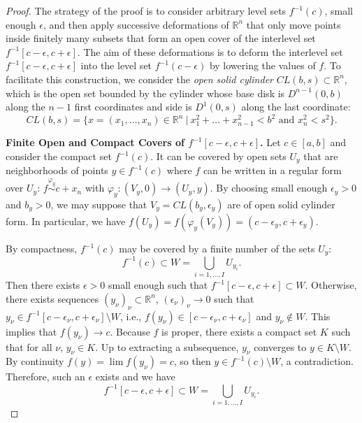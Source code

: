 \documentclass[11pt]{article}
\newcommand{\R}{\mathbb{R}}
\newcommand{\eps}{\epsilon}
\theoremstyle{plain}
\theoremstyle{definition}
\theoremstyle{remark}
\begin{document}
	\begin{proof}
		The strategy of the proof is to consider arbitrary level sets $f^{-1}(c)$, small enough $\eps$, and then apply successive deformations of $\R^n$ that only move points inside finitely many subsets that form an open cover of the interlevel set $f^{-1}[c-\eps, c+ \eps]$. The aim of these deformations is to deform the interlevel set $f^{-1}[c-\eps, c+ \eps]$ into the level set $f^{-1}(c-\eps)$ by lowering the values of $f$. To facilitate this construction, we consider the \emph{open solid cylinder} $CL(b,s) \subset \R^n$, which is the open set bounded by the cylinder whose base disk is $D^{n-1}(0, b)$ along the $n-1$ first coordinates and side is $D^1(0, s)$ along the last coordinate: 
		\[ CL(b,s) = \{x = (x_1,\ldots, x_n) \in \R^n ~|~ x_1^2 + \ldots + x_{n-1}^2 < b^2 \text{ and } x_n^2 < s^2 \}.\] 
		
		\textbf{Finite Open and Compact Covers of $f^{-1}[c-\eps, c+\eps]$.}
		Let $c \in [a,b]$ and consider the compact set $f^{-1}(c)$.
		It can be covered by open sets $U_{y}$ that are neighborhoods of points $y \in f^{-1}(c)$ where $f$ can be written in a regular form over $U_y$: 
		$f \overset{\varphi_y}{\sim} c + x_n$ with $\varphi_y : (V_y, 0) \to (U_y, y)$.
		By choosing small enough $\eps_y > 0$ and $b_y > 0$, we may suppose that $V_y = CL(b_y, \eps_y)$ are of open solid cylinder form. In particular, we have $f(U_y) = f(\varphi_y(V_y)) = (c-\eps_y, c+\eps_y)$.
		
		By compactness, $f^{-1}(c)$ may be covered by a finite number of the sets $U_y$:
		\[f^{-1}(c) \subset W = \bigcup\limits_{i = 1, \ldots, I} U_{y_i}.\]
		Then there exists $\eps > 0$ small enough such that $f^{-1}[c-\eps, c+ \eps] \subset W$. Otherwise, there exists sequences $(y_\nu)_\nu \subset \R^n$, $(\eps_\nu)_\nu \to 0$ such that $y_\nu \in f^{-1}[c-\eps_\nu, c+ \eps_\nu] \setminus W$, i.e., $f(y_\nu) \in [c-\eps_\nu, c+ \eps_\nu]$ and $y_\nu \notin W$. This implies that $f(y_\nu) \to c$. Because $f$ is proper, there exists a compact set $K$ such that for all $\nu$, $y_\nu \in K$. Up to extracting a subsequence, $y_\nu$ converges to $y \in K \setminus W$. By continuity $f(y) = \lim f(y_\nu) = c$, so then $y \in f^{-1}(c) \setminus W$, a contradiction. Therefore, such an $\eps$ exists and we have
		\begin{equation}
			\label{eq:open_covering}
			f^{-1}[c-\eps, c+ \eps] \subset W = \bigcup\limits_{i = 1, \ldots, I} U_{y_i}.
		\end{equation}
		

\end{proof}
\end{document}
